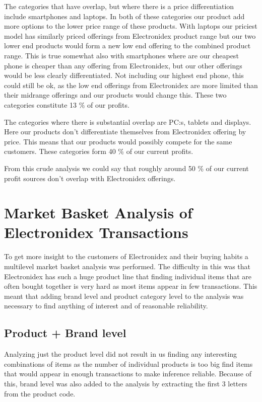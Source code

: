 \documentclass[12pt,a4paper,leqno]{report}
\theoremstyle{plain}
\theoremstyle{definition}
\theoremstyle{remark}
\begin{document}
The categories that have overlap, but where there is a price differentiation include smartphones and laptops.
In both of these categories our product add more options to the lower price range of these products. With laptops
our priciest model has similarly priced offerings from Electronidex product range but our two lower end products
would form a new low end offering to the combined product range. This is true somewhat also with smartphones
where are our cheapest phone is cheaper than any offering from Electronidex, but our other offerings
would be less clearly differentiated. Not including our highest end phone, this could still be ok, as the
low end offerings from Electronidex are more limited than their midrange offerings and our products would change this.
These two categories constitute 13 \% of our profits.

The categories where there is substantial overlap are PC:s, tablets and displays. Here our products
don't differentiate themselves from Electronidex offering by price. This means that our products
would possibly compete for the same customers. These categories form 40 \% of our current profits.

From this crude analysis we could say that roughly around 50 \% of our current profit sources don't
overlap with Electronidex offerings.

\section{Market Basket Analysis of Electronidex Transactions}

To get more insight to the customers of Electronidex and their buying habits a multilevel
market basket analysis was performed. The difficulty in this was that Electronidex has
such a huge product line that finding individual items that are often bought together
is very hard as most items appear in few transactions. This meant that adding brand level
and product category level to the analysis was necessary to find anything of interest and of
reasonable reliability.

\subsection{Product + Brand level}

Analyzing just the product level did not result in us finding any interesting
combinations of items as the number of individual products is too big find
items that would appear in enough transactions to make inference reliable.
Because of this, brand level was also added to the analysis by extracting
the first 3 letters from the product code.
\end{document}
